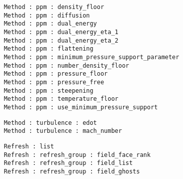 \begin{frame}[fragile,label=ss-param-method]
\begin{verbatim}
    Method : ppm : density_floor
    Method : ppm : diffusion
    Method : ppm : dual_energy
    Method : ppm : dual_energy_eta_1
    Method : ppm : dual_energy_eta_2
    Method : ppm : flattening
    Method : ppm : minimum_pressure_support_parameter
    Method : ppm : number_density_floor
    Method : ppm : pressure_floor
    Method : ppm : pressure_free
    Method : ppm : steepening
    Method : ppm : temperature_floor
    Method : ppm : use_minimum_pressure_support
\end{verbatim}

\begin{verbatim}
    Method : turbulence : edot
    Method : turbulence : mach_number
\end{verbatim}
    
\begin{verbatim}
    Refresh : list
    Refresh : refresh_group : field_face_rank
    Refresh : refresh_group : field_list
    Refresh : refresh_group : field_ghosts
\end{verbatim}

\end{frame}

